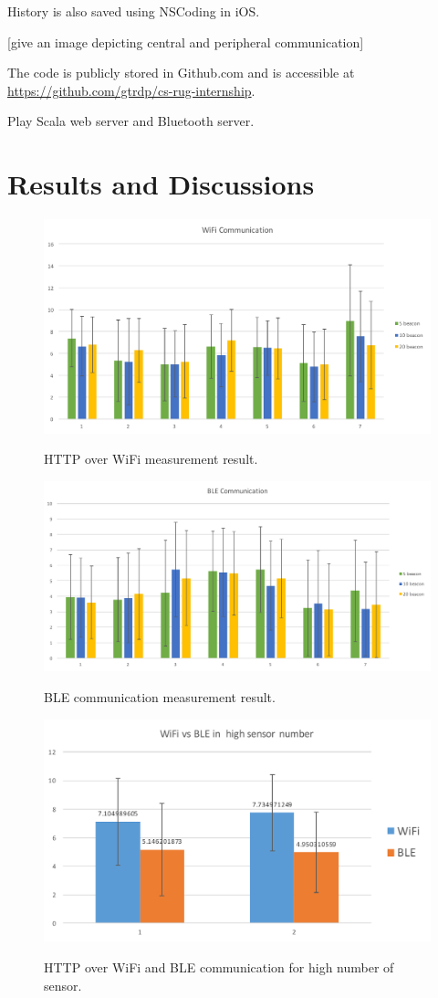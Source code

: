 \documentclass[journal]{vgtc}                %
\begin{document}
History is also saved using NSCoding in iOS.

[give an image depicting central and peripheral communication]

The code is publicly stored in Github.com and is accessible at \url{https://github.com/gtrdp/cs-rug-internship}.

Play Scala web server and Bluetooth server.




\section{Results and Discussions} %
\label{sec:results_and_discussion}

\begin{figure}
  \caption{HTTP over WiFi measurement result.}
  \centering
    \includegraphics[width=.5\textwidth]{wifi}
  \label{fig:wifi-result}
\end{figure}

\begin{figure}
  \caption{BLE communication measurement result.}
  \centering
    \includegraphics[width=.5\textwidth]{ble}
  \label{fig:ble-result}
\end{figure}

\begin{figure}
  \caption{HTTP over WiFi and BLE communication for high number of sensor.}
  \centering
    \includegraphics[width=.5\textwidth]{ble-vs-wifi}
  \label{fig:ble-vs-wifi-result}
\end{figure}
\end{document}
